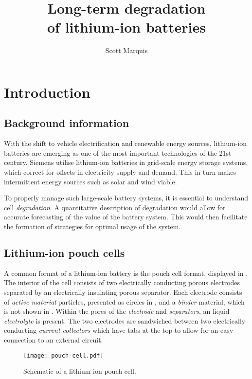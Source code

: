 \documentclass[english,a4paper,oneside,9pt]{extarticle}
\title{Long-term degradation \\ of lithium-ion batteries}
\author{Scott Marquis}
\begin{document}

\section{Introduction}
\subsection{Background information}

With the shift to vehicle electrification and renewable energy sources, lithium-ion batteries are emerging as one of the most important technologies of the 21st century. Siemens utilise lithium-ion batteries in grid-scale energy storage systems, which correct for offsets in electricity supply and demand. This in turn makes intermittent energy sources such as solar and wind viable.

To properly manage such large-scale battery systems, it is essential to understand cell \emph{degradation}. A quantitative description of degradation would allow for accurate forecasting of the value of the battery system. This would then facilitate the formation of strategies for optimal usage of the system.

\subsection{Lithium-ion pouch cells}
A common format of a lithium-ion battery is the pouch cell format, displayed in . The interior of the cell consists of two electrically conducting porous electrodes separated by an electrically insulating porous separator. Each electrode consists of \emph{active material} particles, presented as circles in , and a \emph{binder} material, which is not shown in . Within the pores of the \emph{electrode} and \emph{separators}, an liquid \emph{electrolyte} is present. The two electrodes are sandwiched between two electrically conducting \emph{current collectors} which have tabs at the top to allow for an easy connection to an external circuit.

\begin{figure}[htbp]
	\centering
	\texttt{[image: pouch-cell.pdf]}
	\caption{Schematic of a lithium-ion pouch cell.}
	\label{fig:pouch-cell}
\end{figure}
\end{document}
